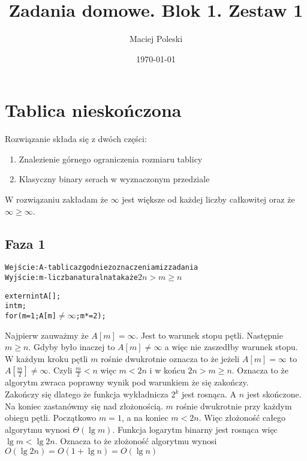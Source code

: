 \documentclass[a4paper,12pt]{article}
\title{Zadania domowe. Blok 1. Zestaw 1}
\author{Maciej Poleski}
\date{\today}
\begin{document}
\maketitle

\newpage

\section{Tablica nieskończona}
Rozwiązanie składa się z dwóch części:
\begin{enumerate}
 \item Znalezienie górnego ograniczenia rozmiaru tablicy
 \item Klasyczny binary serach w wyznaczonym przedziale
\end{enumerate}
W rozwiązaniu zakładam że $\infty$ jest większe od każdej liczby całkowitej oraz że $\infty\geq{\infty}$.
\subsection*{Faza 1}
\begin{alltt}
 Wejście: A - tablica zgodnie z oznaczeniami z zadania
 Wyjście: m - liczba naturalna taka że \(2n>m\geq{n}\)
 
 extern int A[];
 int m;
 for(m=1 ; A[m]\(\neq\infty\) ; m*=2);
\end{alltt} 
Najpierw zauważmy że $A[m]=\infty$. Jest to warunek stopu pętli.
Następnie $m\geq{n}$. Gdyby było inaczej to $A[m]\neq\infty$ a więc nie zaszedłby warunek stopu.
W każdym kroku pętli $m$ rośnie dwukrotnie oznacza to że jeżeli $A[m]=\infty$ to $A[\frac{m}{2}]\neq\infty$. Czyli $\frac{m}{2}<n$ więc $m<2n$ i w końcu $2n>m\geq{n}$. Oznacza to że algorytm zwraca poprawny wynik pod warunkiem że się zakończy.\\
Zakończy się dlatego że funkcja wykładnicza $2^k$ jest rosnąca. A $n$ jest skończone.\\
Na koniec zastanówmy się nad złożonością. $m$ rośnie dwukrotnie przy każdym obiegu pętli. Początkowo $m=1$, a na koniec $m<2n$. Więc złożoność całego algorytmu wynosi $\varTheta(\lg{m})$.
Funkcja logarytm binarny jest rosnąca więc $\lg{m}<\lg{2n}$. Oznacza to że złożoność algorytmu wynosi $O(\lg{2n}) = O(1+\lg{n}) = O(\lg{n})$
\end{document}
